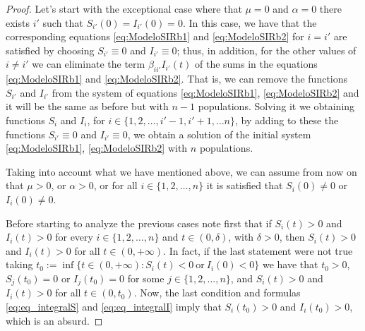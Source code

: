 \documentclass[a4paper,10pt]{article}
\theoremstyle{remark}
\begin{document}
\begin{proof} 



Let's start with the exceptional case where that $\mu=0$ and $\alpha=0$ there exists $i'$ such that $S_{i'}(0)=I_{i'}(0)=0$. In this case, we have that the corresponding equations \eqref{eq:ModeloSIRb1} and \eqref{eq:ModeloSIRb2} for $i=i'$ are satisfied by choosing $S_{i'}\equiv 0$ and $I_{i'}\equiv 0$;  thus, in addition, for the other values of $i\neq i'$ we can eliminate the term $\beta_{ii'}I_{i'}(t)$ of the sums in the equations \eqref{eq:ModeloSIRb1} and \eqref{eq:ModeloSIRb2}. That is, we can remove the functions $S_{i'}$ and $I_{i'}$ from the system of equations \eqref{eq:ModeloSIRb1}, \eqref{eq:ModeloSIRb2} and it will be the same as before but with $n-1$ populations. Solving it we obtaining functions $S_{i}$ and $I_i$, for $i\in\{1,2,\ldots,i'-1,i'+1,\ldots n\}$, by adding to these the functions $S_{i'}\equiv 0$ and $I_{i'}\equiv 0$, we obtain a solution of the initial system \eqref{eq:ModeloSIRb1}, \eqref{eq:ModeloSIRb2} with $n$ populations.

Taking into account what we have mentioned above, we can assume from now on that $\mu>0$, or $\alpha>0$, or for all $i\in\{1,2,\ldots,n\}$ it is satisfied that $S_i(0)\neq 0$ or $I_i(0)\neq 0$.

Before starting to analyze the previous cases note first that if $S_{i}(t)>0$ and $I_i(t)>0$ for every $i\in\{1,2,\ldots,n\}$ and $t\in (0,\delta)$, with $\delta>0$, then $S_i(t)>0$ and $I_i(t)>0$ for all $t\in (0,+\infty)$. In fact, if the last statement were not true taking $t_0:=\inf\{t\in (0,+\infty): S_i(t)<0\ \text{or}\ I_i(0)<0\}$ we have that $t_0>0$, $S_j(t_0)=0$ or $I_j(t_0)=0$ for some 
$j\in\{1,2,\ldots,n\}$, and $S_i(t)>0$ and $I_i(t)>0$ for all $t\in (0,t_0)$. 
Now, the last condition and formulas \eqref{eq:eq_integralS} and \eqref{eq:eq_integralI} imply that $S_i(t_0)>0$ and $I_i(t_0)>0$, which is an absurd.




\end{proof}
\end{document}
